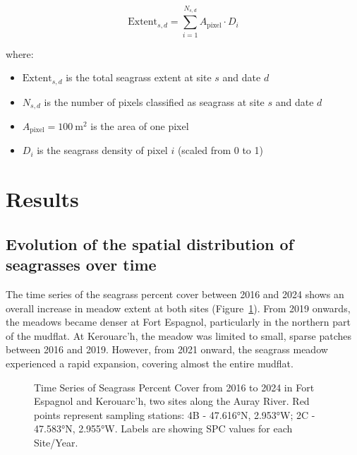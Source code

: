 \documentclass[
  number]{elsarticle}
\providecommand{\tightlist}{%
  \setlength{\itemsep}{0pt}\setlength{\parskip}{0pt}}
\begin{document}
\[
\text{Extent}_{s,d} = \sum_{i=1}^{N_{s,d}} A_{\text{pixel}} \cdot D_i
\]

where:

\begin{itemize}
\tightlist
\item
  \(\text{Extent}_{s,d}\) is the total seagrass extent at site \(s\) and
  date \(d\)\\
\item
  \(N_{s,d}\) is the number of pixels classified as seagrass at site
  \(s\) and date \(d\)\\
\item
  \(A_{\text{pixel}} = 100\ \text{m}^2\) is the area of one pixel\\
\item
  \(D_i\) is the seagrass density of pixel \(i\) (scaled from 0 to 1)
\end{itemize}

\section{Results}\label{results}

\subsection{Evolution of the spatial distribution of seagrasses over
time}\label{evolution-of-the-spatial-distribution-of-seagrasses-over-time}

The time series of the seagrass percent cover between 2016 and 2024
shows an overall increase in meadow extent at both sites
(Figure~\ref{fig-Maps}). From 2019 onwards, the meadows became denser at
Fort Espagnol, particularly in the northern part of the mudflat. At
Kerouarc'h, the meadow was limited to small, sparse patches between 2016
and 2019. However, from 2021 onward, the seagrass meadow experienced a
rapid expansion, covering almost the entire mudflat.

\label{cell-fig-Maps}
\begin{figure}[H]


\caption{\label{fig-Maps}Time Series of Seagrass Percent Cover from 2016
to 2024 in Fort Espagnol and Kerouarc'h, two sites along the Auray
River. Red points represent sampling stations: 4B - 47.616°N, 2.953°W;
2C - 47.583°N, 2.955°W. Labels are showing SPC values for each
Site/Year.}

\end{figure}%
\end{document}

